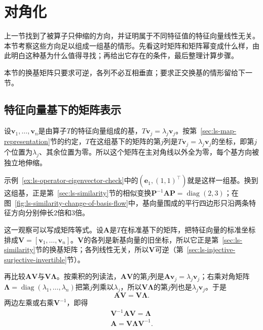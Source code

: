 
\section{对角化}
\label{sec:ls-matrix-powers}
\label{sec:ch06-powers-spectrum}

上一节找到了被算子只伸缩的方向，并证明属于不同特征值的特征向量线性无关。本节考察这些方向足以组成一组基的情形。先看这时矩阵和矩阵幂变成什么样，由此明白这种基为什么值得寻找；再给出它存在的条件，最后整理计算步骤。

本节的换基矩阵只要求可逆，各列不必互相垂直；要求正交换基的情形留给下一节。

\subsection{特征向量基下的矩阵表示}
\label{sec:matrix-analysis-spectrum}

设$\bm v_1,\ldots,\bm v_n$是由算子$T$的特征向量组成的基，$T\bm v_j=\lambda_j\bm v_j$。按第~\ref{sec:ls-map-representation}节的约定，$T$在这组基下的矩阵的第$j$列是$T\bm v_j=\lambda_j\bm v_j$的坐标，即第$j$个位置为$\lambda_j$、其余位置为零。所以这个矩阵在主对角线以外全为零，每个基方向被独立地伸缩。

示例~\ref{ex:ls-operator-eigenvector-check}中的$(\bm e_1,(1,1)^{\top})$就是这样一组基。换到这组基，正是第~\ref{sec:ls-similarity}节的相似变换$\bm P^{-1}\bm A\bm P=\operatorname{diag}(2,3)$；在图~\ref{fig:ls-similarity-change-of-basis-flow}中，基向量围成的平行四边形只沿两条特征方向分别伸长$2$倍和$3$倍。

这一观察可以写成矩阵等式。设$\bm A$是$T$在标准基下的矩阵，把特征向量的标准坐标排成$\bm V=[\bm v_1,\ldots,\bm v_n]$。$\bm V$的各列是新基向量的旧坐标，所以它正是第~\ref{sec:ls-similarity}节的换基矩阵；各列线性无关，所以$\bm V$可逆（第~\ref{sec:ls-injective-surjective-invertible}节）。

再比较$\bm A\bm V$与$\bm V\bm\Lambda$。按乘积的列读法，$\bm A\bm V$的第$j$列是$\bm A\bm v_j=\lambda_j\bm v_j$；右乘对角矩阵$\bm\Lambda=\operatorname{diag}(\lambda_1,\ldots,\lambda_n)$把第$j$列乘以$\lambda_j$，所以$\bm V\bm\Lambda$的第$j$列也是$\lambda_j\bm v_j$。于是
\[
 \bm A\bm V=\bm V\bm\Lambda .
\]
两边左乘或右乘$\bm V^{-1}$，即得
\begin{equation}
 \begin{gathered}
\bm V^{-1}\bm A\bm V=\bm\Lambda\\
\bm A=\bm V\bm\Lambda\bm V^{-1}.
 \end{gathered}
 \label{eq:ls-diagonalization}
\end{equation}

